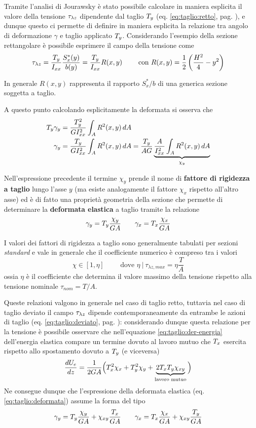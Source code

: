 		Tramite l'analisi di Jourawsky è stato possibile calcolare in maniera esplicita il valore della tensione $\tau_{\lambda z}$ dipendente dal taglio $T_y$ (eq. \ref{eq:taglio:retto}, pag. \pageref{eq:taglio:retto}), e dunque questo ci permette di definire in maniera esplicita la relazione tra angolo di deformazione $\gamma$ e taglio applicato $T_y$. Considerando l'esempio della sezione rettangolare è possibile esprimere il campo della tensione come		
		\[ \tau_{\lambda z} = \frac{T_y  }{I_{xx}} \frac {S_x^*(y)}{ b(y)} = \frac {T_y} {I_{xx}} R(x,y) \qquad \textrm{ con } R(x,y) = \frac 1 2 \left( \frac{H^2}{4} - y^2 \right) \]
		\begin{nota}
			In generale $R(x,y)$ rappresenta il rapporto $S_x^*/b$ di una generica sezione soggetta a taglio.
		\end{nota}
		A questo punto calcolando esplicitamente la deformata si osserva che
		\begin{align*}
			T_y \gamma_y & = \frac{T_y^2}{G I_{xx}^2} \int_A R^2(x,y)\, dA \\
			\gamma_y & = \frac {T_y}{G I_{xx}^2} \int_A R^2(x,y)\, dA = \frac {T_y}{AG} \underbrace{ \frac A {I_{xx}^2} \int_A R^2(x,y)\, dA }_{\chi_y}
		\end{align*}
		\begin{concetto}
			Nell'espressione precedente il termine $\chi_y$ prende il nome di \textbf{fattore di rigidezza a taglio} lungo l'asse $y$ (ma esiste analogamente il fattore $\chi_x$ rispetto all'altro asse) ed è di fatto una proprietà geometria della sezione che permette di determinare la \textbf{deformata elastica} a taglio tramite la relazione
			\begin{equation} \label{eq:taglio:deformata}
				\gamma_y = T_y \frac{\chi_y}{GA} \qquad \gamma_x = T_x \frac{\chi_x}{GA}
			\end{equation}
		\end{concetto}
		I valori  dei fattori di rigidezza a taglio sono generalmente tabulati per sezioni \textit{standard} e vale in generale che il coefficiente numerico è compreso tra i valori
		\[ \chi \in [1,\eta] \qquad \textrm{ dove } \eta \ | \ \tau_{\lambda z,max} = \eta \frac T A \]
		ossia $\eta$ è il coefficiente che determina il valore massimo della tensione rispetto alla tensione nominale $\tau_{nom} = T/A$. 
		\vspace{3mm}
		
		Queste relazioni valgono in generale nel caso di taglio retto, tuttavia nel caso di taglio deviato il campo $\tau_{\lambda z}$ dipende contemporaneamente da entrambe le azioni di taglio (eq. \ref{eq:taglio:deviato}, pag. \pageref{eq:taglio:deviato}): considerando dunque questa relazione per la tensione è possibile osservare che nell'equazione \ref{eq:taglio:der-energia} dell'energia elastica compare un termine dovuto al lavoro mutuo che $T_x$ esercita rispetto allo spostamento dovuto a $T_y$ (e viceversa)
		\[ \frac {dU_e}{dz} = \frac 1 {2GA} \Big( T_x^2 \chi_x + T_y^2 \chi_y + \underbrace{2T_xT_y \chi_{xy}}_\textrm{lavoro mutuo} \Big) \]
		Ne consegue dunque che l'espressione della deformata elastica (eq. \ref{eq:taglio:deformata}) assume la forma del tipo
		\[ \gamma_y = T_y \frac{\chi_y}{GA} + \chi_{xy} \frac {T_x} {GA} \qquad \gamma_x = T_x \frac{\chi_x}{GA} + \chi_{xy} \frac {T_y} {GA} \]
		

